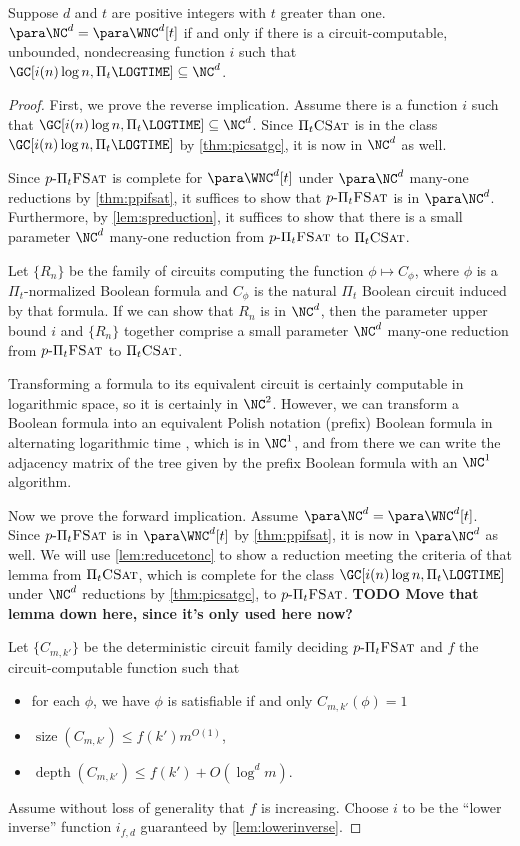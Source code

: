\documentclass{article}
\newcommand{\todo}[1]{\textbf{TODO #1}}
\newcommand{\dash}{\textnormal{-}}
\newcommand{\pPiFSAT}{p \dash \Pi_t \textsc{FSat}}
\newcommand{\PiCSAT}{\Pi_t \textsc{CSat}}
\DeclareMathOperator{\depth}{depth}
\DeclareMathOperator{\size}{size}
\begin{document}
\begin{theorem}\label{thm:ncwnct}
  Suppose $d$ and $t$ are positive integers with $t$ greater than one.
  $\para \NC^d = \para \WNC^d[t]$ if and only if there is a circuit-computable, unbounded, nondecreasing function $i$ such that %
  $\GC[i(n) \log n, \Pi_t \LOGTIME] \subseteq \NC^d$.
\end{theorem}
\begin{proof}
  First, we prove the reverse implication.
  Assume there is a function $i$ such that $\GC[i(n) \log n, \Pi_t \LOGTIME] \subseteq \NC^d$.
  Since $\PiCSAT$ is in the class $\GC[i(n) \log n, \Pi_t \LOGTIME]$ by \autoref{thm:picsatgc}, it is now in $\NC^d$ as well.

  Since $\pPiFSAT$ is complete for $\para \WNC^d[t]$ under $\para \NC^d$ many-one reductions by \autoref{thm:ppifsat}, it suffices to show that $\pPiFSAT$ is in $\para \NC^d$.
  Furthermore, by \autoref{lem:spreduction}, it suffices to show that there is a small parameter $\NC^d$ many-one reduction from $\pPiFSAT$ to $\PiCSAT$.

  Let $\{R_n\}$ be the family of circuits computing the function $\phi \mapsto C_\phi$, where $\phi$ is a $\Pi_t$-normalized Boolean formula and $C_\phi$ is the natural $\Pi_t$ Boolean circuit induced by that formula.
  If we can show that $R_n$ is in $\NC^d$, then the parameter upper bound $i$ and $\{R_n\}$ together comprise a small parameter $\NC^d$ many-one reduction from $\pPiFSAT$ to $\PiCSAT$.

  Transforming a formula to its equivalent circuit is certainly computable in logarithmic space, so it is certainly in $\NC^2$.
  However, we can transform a Boolean formula into an equivalent Polish notation (prefix) Boolean formula in alternating logarithmic time \autocite{buss87}, which is in $\NC^1$, and from there we can write the adjacency matrix of the tree given by the prefix Boolean formula with an $\NC^1$ algorithm.

  Now we prove the forward implication.
  Assume $\para \NC^d = \para \WNC^d[t]$.
  Since $\pPiFSAT$ is in $\para \WNC^d[t]$ by \autoref{thm:ppifsat}, it is now in $\para \NC^d$ as well.
  We will use \autoref{lem:reducetonc} to show a reduction meeting the criteria of that lemma from $\PiCSAT$, which is complete for the class $\GC[i(n) \log n, \Pi_t \LOGTIME]$ under $\NC^d$ reductions by \autoref{thm:picsatgc}, to $\pPiFSAT$.
  \todo{Move that lemma down here, since it's only used here now?}

  Let $\{C_{m, k'}\}$ be the deterministic circuit family deciding $\pPiFSAT$ and $f$ the circuit-computable function such that
  \begin{itemize}
  \item for each $\phi$, we have $\phi$ is satisfiable if and only $C_{m, k'}(\phi) = 1$
  \item $\size(C_{m, k'}) \leq f(k') m^{O(1)}$,
  \item $\depth(C_{m, k'}) \leq f(k') + O(\log^d m)$.
  \end{itemize}
  Assume without loss of generality that $f$ is increasing.
  Choose $i$ to be the ``lower inverse'' function $i_{f, d}$ guaranteed by \autoref{lem:lowerinverse}.


\end{proof}
\end{document}
